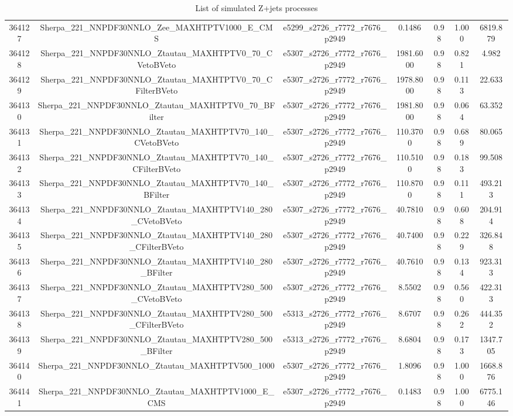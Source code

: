 \begin{table}[htbp]
\begin{center}
{\begin{tabular}{ccccccc}
364127 & Sherpa\_221\_NNPDF30NNLO\_Zee\_MAXHTPTV1000\_E\_CMS & e5299\_s2726\_r7772\_r7676\_p2949 & 0.1486 & 0.98 & 1.000 & 6819.879 \\ 
364128 & Sherpa\_221\_NNPDF30NNLO\_Ztautau\_MAXHTPTV0\_70\_CVetoBVeto & e5307\_s2726\_r7772\_r7676\_p2949 & 1981.6000 & 0.98 & 0.821 & 4.982 \\ 
364129 & Sherpa\_221\_NNPDF30NNLO\_Ztautau\_MAXHTPTV0\_70\_CFilterBVeto & e5307\_s2726\_r7772\_r7676\_p2949 & 1978.8000 & 0.98 & 0.113 & 22.633 \\ 
364130 & Sherpa\_221\_NNPDF30NNLO\_Ztautau\_MAXHTPTV0\_70\_BFilter & e5307\_s2726\_r7772\_r7676\_p2949 & 1981.8000 & 0.98 & 0.064 & 63.352 \\ 
364131 & Sherpa\_221\_NNPDF30NNLO\_Ztautau\_MAXHTPTV70\_140\_CVetoBVeto & e5307\_s2726\_r7772\_r7676\_p2949 & 110.3700 & 0.98 & 0.689 & 80.065 \\ 
364132 & Sherpa\_221\_NNPDF30NNLO\_Ztautau\_MAXHTPTV70\_140\_CFilterBVeto & e5307\_s2726\_r7772\_r7676\_p2949 & 110.5100 & 0.98 & 0.183 & 99.508 \\ 
364133 & Sherpa\_221\_NNPDF30NNLO\_Ztautau\_MAXHTPTV70\_140\_BFilter & e5307\_s2726\_r7772\_r7676\_p2949 & 110.8700 & 0.98 & 0.111 & 493.213 \\ 
364134 & Sherpa\_221\_NNPDF30NNLO\_Ztautau\_MAXHTPTV140\_280\_CVetoBVeto & e5307\_s2726\_r7772\_r7676\_p2949 & 40.7810 & 0.98 & 0.608 & 204.914 \\ 
364135 & Sherpa\_221\_NNPDF30NNLO\_Ztautau\_MAXHTPTV140\_280\_CFilterBVeto & e5307\_s2726\_r7772\_r7676\_p2949 & 40.7400 & 0.98 & 0.229 & 326.848 \\ 
364136 & Sherpa\_221\_NNPDF30NNLO\_Ztautau\_MAXHTPTV140\_280\_BFilter & e5307\_s2726\_r7772\_r7676\_p2949 & 40.7610 & 0.98 & 0.134 & 923.313 \\ 
364137 & Sherpa\_221\_NNPDF30NNLO\_Ztautau\_MAXHTPTV280\_500\_CVetoBVeto & e5307\_s2726\_r7772\_r7676\_p2949 & 8.5502 & 0.98 & 0.560 & 422.313 \\ 
364138 & Sherpa\_221\_NNPDF30NNLO\_Ztautau\_MAXHTPTV280\_500\_CFilterBVeto & e5313\_s2726\_r7772\_r7676\_p2949 & 8.6707 & 0.98 & 0.262 & 444.352 \\ 
364139 & Sherpa\_221\_NNPDF30NNLO\_Ztautau\_MAXHTPTV280\_500\_BFilter & e5313\_s2726\_r7772\_r7676\_p2949 & 8.6804 & 0.98 & 0.173 & 1347.705 \\ 
364140 & Sherpa\_221\_NNPDF30NNLO\_Ztautau\_MAXHTPTV500\_1000 & e5307\_s2726\_r7772\_r7676\_p2949 & 1.8096 & 0.98 & 1.000 & 1668.876 \\ 
364141 & Sherpa\_221\_NNPDF30NNLO\_Ztautau\_MAXHTPTV1000\_E\_CMS & e5307\_s2726\_r7772\_r7676\_p2949 & 0.1483 & 0.98 & 1.000 & 6775.146 \\ 
\hline
\end{tabular}}
\end{center}
\caption{List of simulated Z+jets processes}
\label{table:zjets}
\end{table} 
